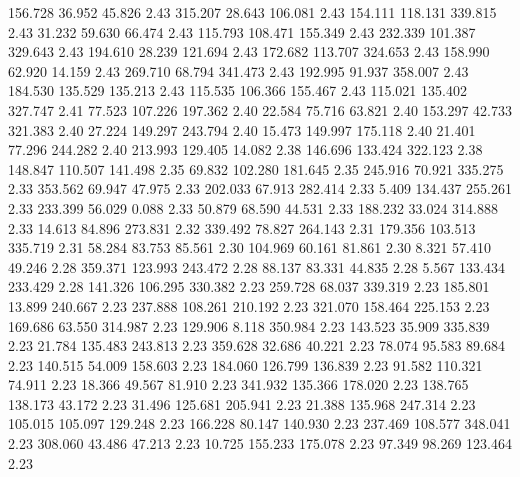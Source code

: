  156.728   36.952   45.826         2.43
 315.207   28.643  106.081         2.43
 154.111  118.131  339.815         2.43
  31.232   59.630   66.474         2.43
 115.793  108.471  155.349         2.43
 232.339  101.387  329.643         2.43
 194.610   28.239  121.694         2.43
 172.682  113.707  324.653         2.43
 158.990   62.920   14.159         2.43
 269.710   68.794  341.473         2.43
 192.995   91.937  358.007         2.43
 184.530  135.529  135.213         2.43
 115.535  106.366  155.467         2.43
 115.021  135.402  327.747         2.41
  77.523  107.226  197.362         2.40
  22.584   75.716   63.821         2.40
 153.297   42.733  321.383         2.40
  27.224  149.297  243.794         2.40
  15.473  149.997  175.118         2.40
  21.401   77.296  244.282         2.40
 213.993  129.405   14.082         2.38
 146.696  133.424  322.123         2.38
 148.847  110.507  141.498         2.35
  69.832  102.280  181.645         2.35
 245.916   70.921  335.275         2.33
 353.562   69.947   47.975         2.33
 202.033   67.913  282.414         2.33
   5.409  134.437  255.261         2.33
 233.399   56.029    0.088         2.33
  50.879   68.590   44.531         2.33
 188.232   33.024  314.888         2.33
  14.613   84.896  273.831         2.32
 339.492   78.827  264.143         2.31
 179.356  103.513  335.719         2.31
  58.284   83.753   85.561         2.30
 104.969   60.161   81.861         2.30
   8.321   57.410   49.246         2.28
 359.371  123.993  243.472         2.28
  88.137   83.331   44.835         2.28
   5.567  133.434  233.429         2.28
 141.326  106.295  330.382         2.23
 259.728   68.037  339.319         2.23
 185.801   13.899  240.667         2.23
 237.888  108.261  210.192         2.23
 321.070  158.464  225.153         2.23
 169.686   63.550  314.987         2.23
 129.906    8.118  350.984         2.23
 143.523   35.909  335.839         2.23
  21.784  135.483  243.813         2.23
 359.628   32.686   40.221         2.23
  78.074   95.583   89.684         2.23
 140.515   54.009  158.603         2.23
 184.060  126.799  136.839         2.23
  91.582  110.321   74.911         2.23
  18.366   49.567   81.910         2.23
 341.932  135.366  178.020         2.23
 138.765  138.173   43.172         2.23
  31.496  125.681  205.941         2.23
  21.388  135.968  247.314         2.23
 105.015  105.097  129.248         2.23
 166.228   80.147  140.930         2.23
 237.469  108.577  348.041         2.23
 308.060   43.486   47.213         2.23
  10.725  155.233  175.078         2.23
  97.349   98.269  123.464         2.23
